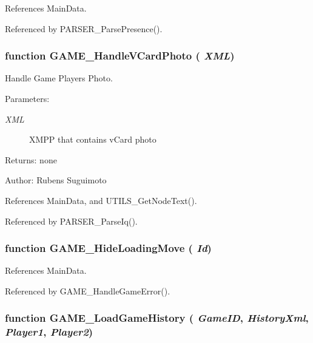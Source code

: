 References MainData.

Referenced by PARSER\_\-ParsePresence().
\subsubsection[GAME\_\-HandleVCardPhoto]{\setlength{\rightskip}{0pt plus 5cm}function GAME\_\-HandleVCardPhoto ( {\em XML})}\label{game_2game_8js_77a53c8ab241cb3beec3b1e2b7c2d009}


Handle Game Players Photo. 

\begin{Desc}
\item[Parameters:]
\begin{description}
\item[{\em XML}]XMPP that contains vCard photo \end{description}
\end{Desc}
\begin{Desc}
\item[Returns:]none \end{Desc}
\begin{Desc}
\item[Author:]Rubens Suguimoto \end{Desc}


References MainData, and UTILS\_\-GetNodeText().

Referenced by PARSER\_\-ParseIq().
\subsubsection[GAME\_\-HideLoadingMove]{\setlength{\rightskip}{0pt plus 5cm}function GAME\_\-HideLoadingMove ( {\em Id})}\label{game_2game_8js_8e14a3ee6855eda7a0abc2d2038ee171}




References MainData.

Referenced by GAME\_\-HandleGameError().
\subsubsection[GAME\_\-LoadGameHistory]{\setlength{\rightskip}{0pt plus 5cm}function GAME\_\-LoadGameHistory ( {\em GameID}, \/   {\em HistoryXml}, \/   {\em Player1}, \/   {\em Player2})}\label{game_2game_8js_62aa80a6b39d1e8215c68e15949fe3c8}



